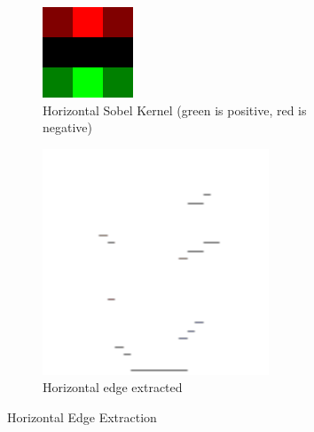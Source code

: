 \documentclass[a4paper,12pt]{article}
\begin{document}
\begin{figure}[H]
	\begin{subfigure}{0.5\textwidth}
		\centering
		\includegraphics[width=0.5\linewidth]{./sobel 1.png}
		\caption{Horizontal Sobel Kernel (green is positive, red is negative) }
		\label{fig:sobel 1}
	\end{subfigure}
	\begin{subfigure}{0.5\textwidth}
		\centering
		\includegraphics[width=0.5\linewidth]{./sobel 1 e.png}
		\caption{Horizontal edge extracted}
		\label{fig:sobel 2}
	\end{subfigure}
	\caption{Horizontal Edge Extraction}
\end{figure}
\end{document}
